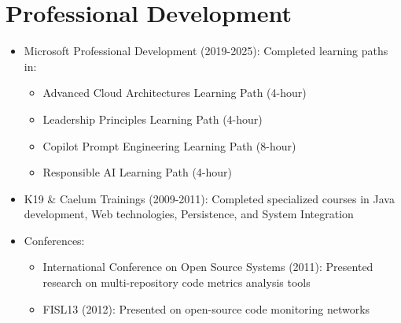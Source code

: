 
\section{Professional Development}
\begin{itemize}
    \item \small{Microsoft Professional Development (2019-2025):}
    \footnotesize{Completed learning paths in:}
    \begin{itemize}[itemsep=1pt, parsep=0pt]
        \item \footnotesize{Advanced Cloud Architectures Learning Path (4-hour)}
        \item \footnotesize{Leadership Principles Learning Path (4-hour)}
        \item \footnotesize{Copilot Prompt Engineering Learning Path (8-hour)}%
        \item \footnotesize{Responsible AI Learning Path (4-hour)}%
    \end{itemize}
    \item \small{K19 \& Caelum Trainings (2009-2011):} \footnotesize{Completed specialized courses in Java development, Web technologies, Persistence, and System Integration}
    \item \small{Conferences:}
    \begin{itemize}[itemsep=1pt, parsep=0pt]
        \item \footnotesize{International Conference on Open Source Systems (2011): Presented research on multi-repository code metrics analysis tools}
        \item \footnotesize{FISL13 (2012): Presented on open-source code monitoring networks}
    \end{itemize}
\end{itemize}